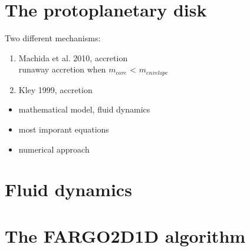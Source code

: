 

\section{The protoplanetary disk}


    Two different mechanisms:
    \begin{enumerate}
      \item Machida et al. 2010, accretion \\
      runaway accretion when $m_{core}$ < $m_{envelope}$

      \item Kley 1999, accretion
    \end{enumerate} 

  \begin{itemize}
    \item mathematical model, fluid dynamics
    \item most imporant equations
    \item numerical approach
  \end{itemize}


\section{Fluid dynamics}


\section{The FARGO2D1D algorithm}
